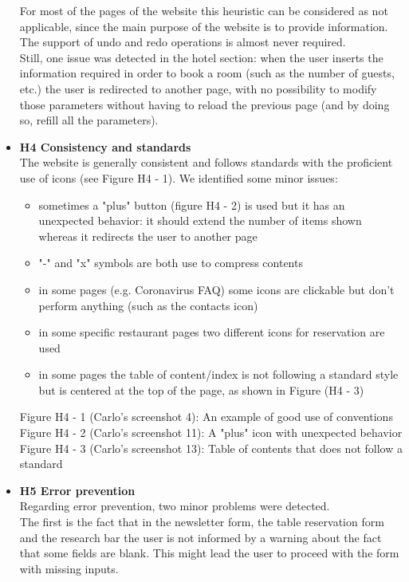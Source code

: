 \begin{itemize}
        For most of the pages of the website this heuristic can be considered as not applicable, since the main purpose of the website is to provide information. The support of undo and redo operations is almost never required.\\
        Still, one issue was detected in the hotel section: when the user inserts the information required in order to book a room (such as the number of guests, etc.) the user is redirected to another page, with no possibility to modify those parameters without having to reload the previous page (and by doing so, refill all the parameters).
    \item \textbf{H4 Consistency and standards}\\
        The website is generally consistent and follows standards with the proficient use of icons (see Figure H4 - 1). We identified some minor issues:
        \begin{itemize}
            \item sometimes a "plus" button (figure H4 - 2) is used but it has an unexpected behavior: it should extend the number of items shown whereas it redirects the user to another page
            \item "-" and "x" symbols are both use to compress contents
            \item in some pages (e.g. Coronavirus FAQ) some icons are clickable but don't perform anything (such as the contacts icon)
            \item in some specific restaurant pages two different icons for reservation are used
            \item in some pages the table of content/index is not following a standard style but is centered at the top of the page, as shown in Figure (H4 - 3)
        \end{itemize}
        Figure H4 - 1 (Carlo's screenshot 4): An example of good use of conventions\\        
        Figure H4 - 2 (Carlo's screenshot 11): A "plus" icon with unexpected behavior\\
        Figure H4 - 3 (Carlo's screenshot 13): Table of contents that does not follow a standard    
    \item \textbf{H5 Error prevention}\\
        Regarding error prevention, two minor problems were detected.\\
        The first is the fact that in the newsletter form, the table reservation form and the research bar the user is not informed by a warning about the fact that some fields are blank. This might lead the user to proceed with the form with missing inputs.

\end{itemize}
